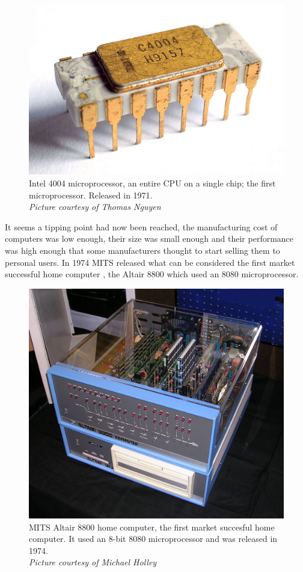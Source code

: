 \begin{figure} \begin{center}
\includegraphics[width=.3\linewidth]{pics/intel_4004} 
\end{center} 
\caption{Intel 4004 microprocessor, an entire CPU on a single chip; the first microprocessor. Released in 1971.\\ \textit{\small{Picture courtesy of Thomas Nguyen}}}
\end{figure} 


It seems a tipping point had now been reached, the manufacturing cost of computers was low enough, their size was small enough and their performance was high enough that some manufacturers thought to start selling them to personal users. In 1974 MITS released what can be considered the first market successful home computer \cite{Dorf95}, the Altair 8800 which used an 8080 microprocessor. \\

\begin{figure} \begin{center}
\includegraphics[width=.3\linewidth]{pics/altair_8800_computer} 
\end{center} 
\caption{MITS Altair 8800 home computer, the first market succesful home computer. It used an 8-bit 8080 microprocessor and was released in 1974.\\ \textit{\small{Picture courtesy of  Michael Holley}}}
\end{figure}

